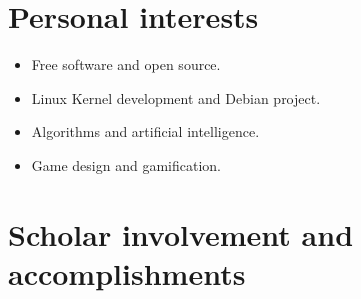 \documentclass{res}
\newcommand{\inFrench}[1]{}
\newcommand{\inEnglish}[1]{#1}
\begin{document}
\begin{resume}
\newpage

\inFrench{
	\section{Intérêts personnels}
}
\inEnglish{
	\section{Personal interests}
}
\vspace{6pt}

\inFrench{
	\vspace{6pt}
	\begin{itemize} \itemsep -2pt
		\item Logiciels libres et open source;
		\item Développement Linux Kernel et projet Debian;
		\item Algorithmie et intelligence artificielle;
		\item Conception de jeux vidéos et ludification (gamification).
	\end{itemize}
}

\inEnglish{
	\vspace{6pt}
	\begin{itemize} \itemsep -2pt
		\item Free software and open source.
		\item Linux Kernel development and Debian project.
		\item Algorithms and artificial intelligence.
		\item Game design and gamification.
	\end{itemize}
}

\inFrench{
	\section{Implication scolaire et accomplissements}
}
\inEnglish{
	\section{Scholar involvement and accomplishments}
}
\vspace{6pt}


\end{resume}
\end{document}
